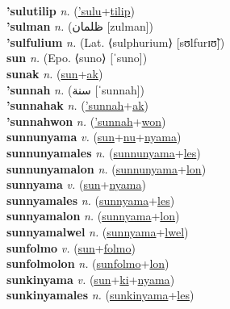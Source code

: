  \label{'suluak} \\
\textbf{'sulutilip} \textit{n.} (\hyperref['sulu]{'sulu}+\hyperref[tilip]{tilip})
 \label{'sulutilip} \\
\textbf{'sulman} \textit{n.} ({\arabics{}ظلمان} [zulman])
 \label{'sulman} \\
\textbf{'sulfulium} \textit{n.} (Lat. ⟨sulphurium⟩ [sʊlfurɪʊ̃])
 \label{'sulfulium} \\
\textbf{sun} \textit{n.} (Epo. ⟨suno⟩ [ˈsuno])
 \label{sun} \\
\textbf{sunak} \textit{n.} (\hyperref[sun]{sun}+\hyperref[ak]{ak})
 \label{sunak} \\
\textbf{'sunnah} \textit{n.} ({\arabics{}سنة} [ˈsunnah])
 \label{'sunnah} \\
\textbf{'sunnahak} \textit{n.} (\hyperref['sunnah]{'sunnah}+\hyperref[ak]{ak})
 \label{'sunnahak} \\
\textbf{'sunnahwon} \textit{n.} (\hyperref['sunnah]{'sunnah}+\hyperref[won]{won})
 \label{'sunnahwon} \\
\textbf{sunnunyama} \textit{v.} (\hyperref[sun]{sun}+\hyperref[nu]{nu}+\hyperref[nyama]{nyama})
 \label{sunnunyama} \\
\textbf{sunnunyamales} \textit{n.} (\hyperref[sunnunyama]{sunnunyama}+\hyperref[les]{les})
 \label{sunnunyamales} \\
\textbf{sunnunyamalon} \textit{n.} (\hyperref[sunnunyama]{sunnunyama}+\hyperref[lon]{lon})
 \label{sunnunyamalon} \\
\textbf{sunnyama} \textit{v.} (\hyperref[sun]{sun}+\hyperref[nyama]{nyama})
 \label{sunnyama} \\
\textbf{sunnyamales} \textit{n.} (\hyperref[sunnyama]{sunnyama}+\hyperref[les]{les})
 \label{sunnyamales} \\
\textbf{sunnyamalon} \textit{n.} (\hyperref[sunnyama]{sunnyama}+\hyperref[lon]{lon})
 \label{sunnyamalon} \\
\textbf{sunnyamalwel} \textit{n.} (\hyperref[sunnyama]{sunnyama}+\hyperref[lwel]{lwel})
 \label{sunnyamalwel} \\
\textbf{sunfolmo} \textit{v.} (\hyperref[sun]{sun}+\hyperref[folmo]{folmo})
 \label{sunfolmo} \\
\textbf{sunfolmolon} \textit{n.} (\hyperref[sunfolmo]{sunfolmo}+\hyperref[lon]{lon})
 \label{sunfolmolon} \\
\textbf{sunkinyama} \textit{v.} (\hyperref[sun]{sun}+\hyperref[ki]{ki}+\hyperref[nyama]{nyama})
 \label{sunkinyama} \\
\textbf{sunkinyamales} \textit{n.} (\hyperref[sunkinyama]{sunkinyama}+\hyperref[les]{les})
